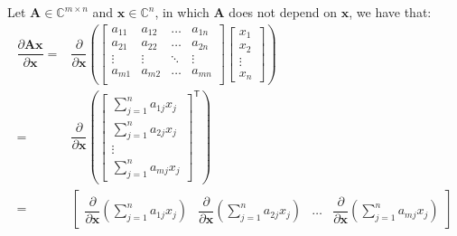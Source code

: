 \documentclass{article}
\newcommand{\trans}{\mathsf{T}}
\begin{document}
Let \(\mathbf{A}\in \mathbb{C}^{m\times n}\) and \(\mathbf{x} \in \mathbb{C}^{n}\), in which \(\mathbf{A}\) does not depend on \(\mathbf{x}\), we have that:
\begin{align}
    \dfrac{\partial \mathbf{A} \mathbf{x}}{\partial \mathbf{x}} = & \dfrac{\partial}{\partial \mathbf{x}} \left(
        \begin{bmatrix}
            a_{11} & a_{12} & \dots & a_{1n} \\
            a_{21} & a_{22} & \dots & a_{2n} \\
            \vdots & \vdots & \ddots & \vdots \\
            a_{m1} & a_{m2} & \dots & a_{mn} \\
        \end{bmatrix} \begin{bmatrix}
            x_{1} \\ x_{2} \\ \vdots \\ x_{n}
        \end{bmatrix} \right)  \\
    = & \dfrac{\partial}{\partial \mathbf{x}} \left(\begin{bmatrix} 
        \sum_{j = 1}^n a_{1j}x_j \\
        \sum_{j = 1}^n a_{2j}x_j \\
        \vdots \\
        \sum_{j = 1}^n a_{mj}x_j
    \end{bmatrix}^\trans \right)  \\
    = & \begin{bmatrix}
        \dfrac{\partial}{\partial \mathbf{x}}\left(\sum_{j = 1}^n {a_{1j}x_j}\right) & \dfrac{\partial}{\partial \mathbf{x}}\left(\sum_{j = 1}^n {a_{2j}x_j}\right) & \dots & \dfrac{\partial}{\partial \mathbf{x}}\left(\sum_{j = 1}^n {a_{mj}x_j}\right)
    \end{bmatrix}
\end{align}
\end{document}
